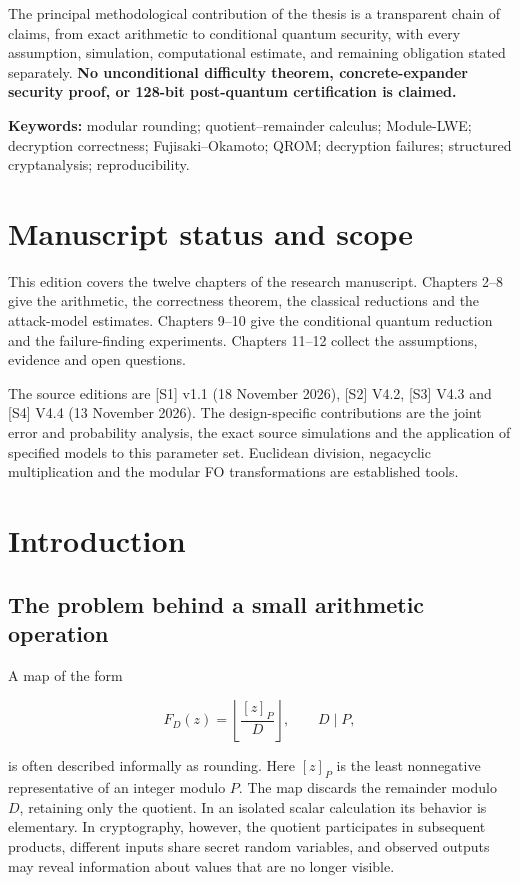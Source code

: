 \documentclass[
  11pt,
  a4paper,
  oneside]{report}
\begin{document}
The principal methodological contribution of the thesis is a transparent
chain of claims, from exact arithmetic to conditional quantum security,
with every assumption, simulation, computational estimate, and remaining
obligation stated separately. \textbf{No unconditional difficulty
theorem, concrete-expander security proof, or 128-bit post-quantum
certification is claimed.}

\textbf{Keywords:} modular rounding; quotient--remainder calculus;
Module-LWE; decryption correctness; Fujisaki--Okamoto; QROM; decryption
failures; structured cryptanalysis; reproducibility.

\chapter*{Manuscript status and
scope}\label{manuscript-status-and-scope}

This edition covers the twelve chapters of the research manuscript.
Chapters 2--8 give the arithmetic, the correctness theorem, the
classical reductions and the attack-model estimates. Chapters 9--10 give
the conditional quantum reduction and the failure-finding experiments.
Chapters 11--12 collect the assumptions, evidence and open questions.

The source editions are {[}S1{]} v1.1 (18 November 2026), {[}S2{]} V4.2,
{[}S3{]} V4.3 and {[}S4{]} V4.4 (13 November 2026). The design-specific
contributions are the joint error and probability analysis, the exact
source simulations and the application of specified models to this
parameter set. Euclidean division, negacyclic multiplication and the
modular FO transformations are established tools.

\chapter{Introduction}\label{introduction}

\section{The problem behind a small arithmetic
operation}\label{the-problem-behind-a-small-arithmetic-operation}

A map of the form

\[
F_D(z)=\left\lfloor\frac{[z]_P}{D}\right\rfloor,
\qquad D\mid P,
\]

is often described informally as rounding. Here \([z]_P\) is the least
nonnegative representative of an integer modulo \(P\). The map discards
the remainder modulo \(D\), retaining only the quotient. In an isolated
scalar calculation its behavior is elementary. In cryptography, however,
the quotient participates in subsequent products, different inputs share
secret random variables, and observed outputs may reveal information
about values that are no longer visible.
\end{document}
